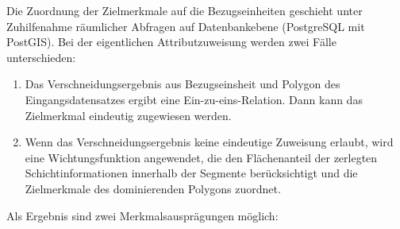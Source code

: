 Die Zuordnung der Zielmerkmale auf die Bezugseinheiten geschieht unter Zuhilfenahme räumlicher Abfragen auf Datenbankebene (PostgreSQL mit PostGIS). Bei der eigentlichen Attributzuweisung werden zwei Fälle unterschieden: 


\begin{enumerate}
\item Das Verschneidungsergebnis aus Bezugseinsheit und Polygon des Eingangsdatensatzes ergibt eine Ein-zu-eins-Relation. Dann kann das Zielmerkmal eindeutig zugewiesen werden.
\item Wenn das Verschneidungsergebnis keine eindeutige Zuweisung erlaubt, wird eine Wichtungsfunktion angewendet, die den Flächenanteil der zerlegten Schichtinformationen innerhalb der Segmente berücksichtigt und die Zielmerkmale des dominierenden Polygons zuordnet.
\end{enumerate}
%
Als Ergebnis sind zwei Merkmalsausprägungen möglich:

